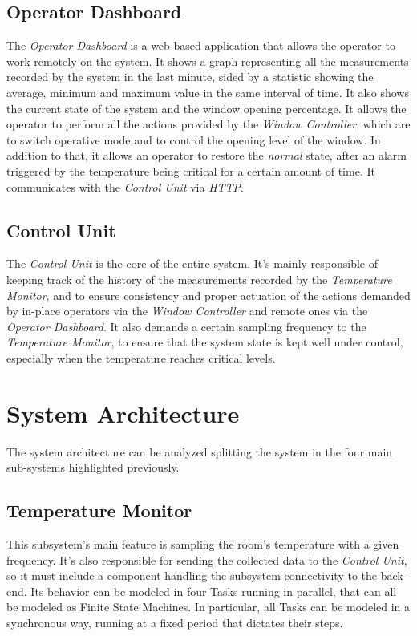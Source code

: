 \documentclass[a4paper,12pt]{report}
\begin{document}
	\section{Operator Dashboard}
	The \textit{Operator Dashboard} is a web-based application that allows the operator to work remotely on the system. It shows a graph representing all the measurements recorded by the system in the last minute, sided by a statistic showing the average, minimum and maximum value in the same interval of time. It also shows the current state of the system and the window opening percentage. It allows the operator to perform all the actions provided by the \textit{Window Controller}, which are to switch operative mode and to control the opening level of the window. In addition to that, it allows an operator to restore the \textit{normal} state, after an alarm triggered by the temperature being critical for a certain amount of time.
	\newline It communicates with the \textit{Control Unit} via \textit{HTTP}.
	\section{Control Unit}
	The \textit{Control Unit} is the core of the entire system. It's mainly responsible of keeping track of the history of the measurements recorded by the \textit{Temperature Monitor}, and to ensure consistency and proper actuation of the actions demanded by in-place operators via the \textit{Window Controller} and remote ones via the \textit{Operator Dashboard}. It also demands a certain sampling frequency to the \textit{Temperature Monitor}, to ensure that the system state is kept well under control, especially when the temperature reaches critical levels.
	
	\chapter{System Architecture}
	The system architecture can be analyzed splitting the system in the four main sub-systems highlighted previously.
	\section{Temperature Monitor}
	This subsystem's main feature is sampling the room's temperature with a given frequency. It's also responsible for sending the collected data to the \textit{Control Unit}, so it must include a component handling the subsystem connectivity to the back-end.
	\newline Its behavior can be modeled in four Tasks running in parallel, that can all be modeled as Finite State Machines. In particular, all Tasks can be modeled in a synchronous way, running at a fixed period that dictates their steps.
\end{document}
